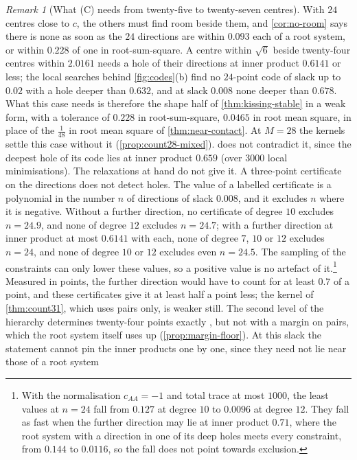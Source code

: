 \documentclass[11pt,reqno]{amsart}
\renewcommand{\_}{\origunderscore\allowbreak}
\numberwithin{equation}{section}
\theoremstyle{plain}
\theoremstyle{definition}
\theoremstyle{remark}
\newtheorem{remark}[thm]{Remark}
\begin{document}
\begin{remark}[What (C) needs from twenty-five to twenty-seven centres]
With $24$ centres close to $c$, the others must find room beside them, and
\cref{cor:no-room} says there is none as soon as the $24$ directions are
within $0.093$ each of a root system, or within $0.228$ of one in
root-sum-square. A centre within $\sqrt6$ beside twenty-four centres within
$2.0161$ needs a hole of their directions at inner product $0.6141$ or less;
the local searches behind \cref{fig:codes}(b) find no $24$-point code of
slack up to $0.02$ with a hole deeper than $0.632$, and at slack $0.008$
none deeper than $0.678$. What this case needs is therefore the shape half
of \cref{thm:kissing-stable} in a weak form, with a tolerance of $0.228$ in
root-sum-square, $0.0465$ in root mean square, in place of the $\frac1{48}$
in root mean square of \cref{thm:near-contact}. At $M=28$ the kernels settle
this case without it (\cref{prop:count28-mixed}). 
does not contradict it, since the deepest hole of its code lies at inner
product $0.659$ (over $3000$ local minimisations). The relaxations at hand
do not give it. A three-point certificate on the directions does not detect
holes. The value of a labelled certificate is a polynomial in the number
$n$ of directions of slack $0.008$, and it excludes $n$ where it is
negative. Without a further direction, no certificate of degree $10$
excludes $n=24.9$, and none of degree $12$ excludes $n=24.7$; with a
further direction at inner product at most $0.6141$ with each, none of
degree $7$, $10$ or $12$ excludes $n=24$, and none of degree $10$ or $12$
excludes even $n=24.5$. The sampling of the constraints can only lower
these values, so a positive value is no artefact of it.\footnote{With the
  normalisation $c_{AA}=-1$ and total trace at most $1000$, the least
  values at $n=24$ fall from $0.127$ at degree $10$ to $0.0096$ at degree
  $12$. They fall as fast when the further direction may lie at inner
  product $0.71$, where the root system with a direction in one of its deep
  holes meets every constraint, from $0.144$ to $0.0116$, so the fall does
  not point towards exclusion.} Measured in points, the further direction
would have to count for at least $0.7$ of a point, and these certificates
give it at least half a point less; the kernel of \cref{thm:count31}, which
uses pairs only, is weaker still. The second level of the hierarchy
determines twenty-four points exactly \cite{LLM24}, but not with a margin on
pairs, which the root system itself uses up (\cref{prop:margin-floor}).
At this slack the statement cannot pin the inner products one by one,
since they need not lie near those of a root system

\end{remark}
\end{document}
